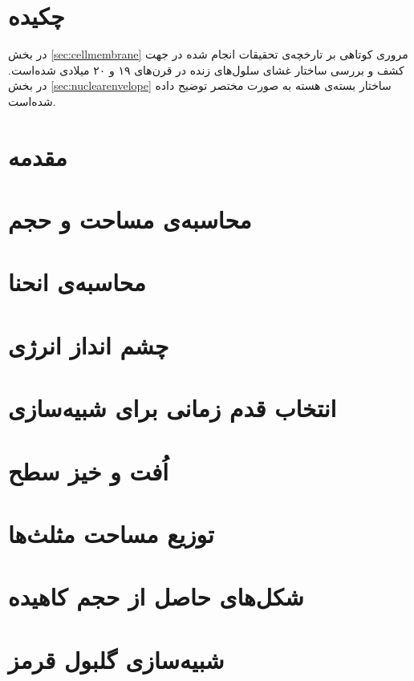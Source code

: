\setRL
\clearpage
\def \MemRes {\Mempath /MembraneResults}

\section{
چکیده
}
در بخش
\ref{sec:cellmembrane}
مروری کوتاهی بر تارخچه‌ی تحقیقات انجام شده در جهت کشف و بررسی ساختار غشای سلول‌های زنده در قرن‌های ۱۹ و ۲۰ میلادی شده‌است. در بخش
\ref{sec:nuclearenvelope}
ساختار بسته‌ی هسته به صورت مختصر توضیح داده شده‌است.

\section{
مقدمه
}



\section{
محاسبه‌ی مساحت و حجم
}


\section{
محاسبه‌ی انحنا
}


\section{
چشم انداز انرژی
}


\section{
انتخاب قدم زمانی برای شبیه‌سازی
}



\section{
اُفت و خیز سطح
}
%

\section{
توزیع مساحت مثلث‌ها
}
%


\section{
شکل‌های حاصل از حجم کاهیده
}
%

\section{
شبیه‌سازی گلبول قرمز
}
%




